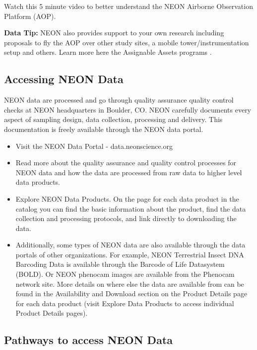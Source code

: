 \documentclass[]{book}
\providecommand{\tightlist}{%
  \setlength{\itemsep}{0pt}\setlength{\parskip}{0pt}}
\begin{document}
Watch this 5 minute video to better understand the NEON Airborne Observation
Platform (AOP).

\leavevmode\hypertarget{ds-dataTip}{}%
 \textbf{Data Tip:} NEON also provides support to your own
research including proposals to fly the AOP over other study sites, a mobile
tower/instrumentation setup and others. Learn more here the
Assignable Assets programs .

\hypertarget{accessing-neon-data}{%
\subsection{Accessing NEON Data}\label{accessing-neon-data}}

NEON data are processed and go through quality assurance quality control checks
at NEON headquarters in Boulder, CO.
NEON carefully documents every aspect of sampling design, data collection,
processing and delivery. This documentation is freely available through the
NEON data portal.

\begin{itemize}
\tightlist
\item
  Visit the
  NEON Data Portal - data.neonscience.org 
\item
  Read more about the
  quality assurance and quality control processes for NEON data
  and how the data are processed from raw data to higher level data products.
\item
  Explore NEON Data Products.
  On the page for each data product in the catalog you can find the basic information
  about the product, find the data collection and processing protocols, and link
  directly to downloading the data.
\item
  Additionally, some types of NEON data are also available through the data portals
  of other organizations. For example,
   NEON Terrestrial Insect DNA Barcoding Data
  is available through the
   Barcode of Life Datasystem (BOLD).
  Or NEON phenocam images are available from the
  Phenocam network site.
  More details on where else the data are available from can be found in the Availability and Download
  section on the Product Details page for each data product (visit
  Explore Data Products
  to access individual Product Details pages).
\end{itemize}

\hypertarget{pathways-to-access-neon-data}{%
\subsection{Pathways to access NEON Data}\label{pathways-to-access-neon-data}}
\end{document}
